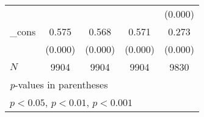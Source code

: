 {\begin{tabular}{l*{4}{c}}
            &                     &                     &                     &     (0.000)         \\
[1em]
\_cons      &       0.575\sym{***}&       0.568\sym{***}&       0.571\sym{***}&       0.273\sym{***}\\
            &     (0.000)         &     (0.000)         &     (0.000)         &     (0.000)         \\
\hline
\(N\)       &        9904         &        9904         &        9904         &        9830         \\
\hline\hline
\multicolumn{5}{l}{\footnotesize \textit{p}-values in parentheses}\\
\multicolumn{5}{l}{\footnotesize \sym{*} \(p<0.05\), \sym{**} \(p<0.01\), \sym{***} \(p<0.001\)}\\
\end{tabular}
}

